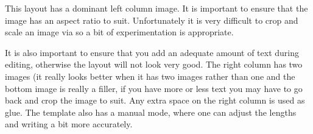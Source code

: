 \begin{bache}
This layout has a dominant left column image. It is important to
ensure that the image has an aspect ratio to suit. Unfortunately
it is very difficult to crop and scale an image via \tex so a bit
of experimentation is appropriate.

It is also important to ensure that you add an adequate amount
of text during editing, otherwise the layout will not look very good. The right
column has two images (it really looks better when it has two images rather than
one and the bottom image is really a filler, if you have more or less
text you may have to go back and crop the image to suit. Any extra space on the right column is used as glue. The template also has a manual mode, where one can adjust the lengths and writing
a bit more accurately. \label{bache}


\end{bache}
